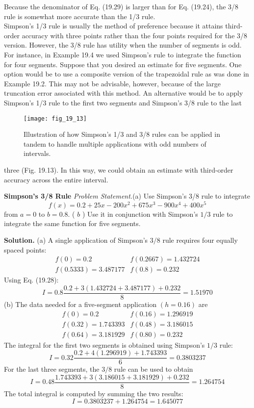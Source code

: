 \documentclass[../main.tex]{subfiles}
\begin{document}
Because the denominator of Eq. (19.29) is larger than for Eq. (19.24), the 3/8 rule is somewhat more accurate than the 1/3 rule.\\

Simpson's 1/3 rule is usually the method of preference because it attains third-order
accuracy with three points rather than the four points required for the 3/8 version. However, the 3/8 rule has utility when the number of segments is odd. For instance, in Example 19.4 we used Simpson's rule to integrate the function for four segments. Suppose that
you desired an estimate for five segments. One option would be to use a composite version
of the trapezoidal rule as was done in Example 19.2. This may not be advisable, however,
because of the large truncation error associated with this method. An alternative would be
to apply Simpson's 1/3 rule to the first two segments and Simpson's 3/8 rule to the last

\begin{figure}[H]
    \centering
    \texttt{[image: fig\_19\_13]}
   \caption{\textsf{Illustration of how Simpson's 1/3 and 3/8 rules can be applied in tandem to handle multiple
   applications with odd numbers of intervals.}}\label{fig:fig_19_13}
\end{figure}
three (Fig. 19.13). In this way, we could obtain an estimate with third-order accuracy across
the entire interval.

\begin{exmp} \textbf{Simpson's 3/8 Rule}
    \noindent\textit{Problem Statement.}(a) Use Simpson's 3/8 rule to integrate
    $$
f(x)=0.2+25 x-200 x^{2}+675 x^{3}-900 x^{4}+400 x^{5}
$$
from $a=0$ to $b=0.8$. ( $b$ ) Use it in conjunction with Simpson's $1 / 3$ rule to integrate the same function for five segments.


	\noindent \textbf{Solution.} (a) A single application of Simpson's $3 / 8$ rule requires four equally spaced points:
	$$
	\begin{array}{ll}
	f(0)=0.2 & f(0.2667)=1.432724 \\
	f(0.5333)=3.487177 & f(0.8)=0.232
	\end{array}
	$$
	Using Eq. (19.28):
	$$
	I=0.8 \frac{0.2+3(1.432724+3.487177)+0.232}{8}=1.51970
	$$
	(b) The data needed for a five-segment application $(h=0.16)$ are
	$$
	\begin{array}{ll}
	f(0)=0.2 & f(0.16)=1.296919 \\
	f(0.32)=1.743393 & f(0.48)=3.186015 \\
	f(0.64)=3.181929 & f(0.80)=0.232
	\end{array}
	$$
	The integral for the first two segments is obtained using Simpson's $1 / 3$ rule:
	$$
	I=0.32 \frac{0.2+4(1.296919)+1.743393}{6}=0.3803237
	$$
	For the last three segments, the $3 / 8$ rule can be used to obtain
	$$
	I=0.48 \frac{1.743393+3(3.186015+3.181929)+0.232}{8}=1.264754
	$$
	The total integral is computed by summing the two results:
	$$
	I=0.3803237+1.264754=1.645077
	$$
\end{exmp}
\end{document}
